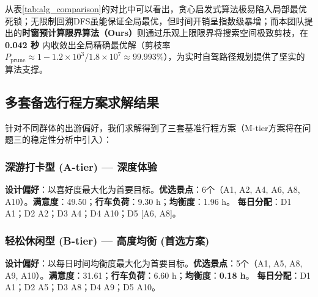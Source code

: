 \documentclass{cumcmthesis}
\begin{document}
从表\ref{tab:alg_comparison}的对比中可以看出，贪心启发式算法极易陷入局部最优死锁；无限制回溯DFS虽能保证全局最优，但时间开销呈指数级暴增；而本团队提出的\textbf{时窗预计算限界算法（Ours）}则通过乐观上限限界将搜索空间极致剪枝，在 \textbf{0.042 秒} 内收敛出全局精确最优解（剪枝率 $P_{\text{prune}} \approx 1 - 1.2\times10^3 / 1.8\times10^7 \approx 99.993\%$），为实时自驾路径规划提供了坚实的算法支撑。


\subsection{多套备选行程方案求解结果}
针对不同群体的出游偏好，我们求解得到了三套基准行程方案（M-tier方案将在问题三的稳定性分析中引入）：
\subsubsection{深游打卡型 (A-tier) — 深度体验}
\textbf{设计偏好}：以喜好度最大化为首要目标。\textbf{优选景点}：6个（A1, A2, A4, A6, A8, A10）。\textbf{满意度}：49.50；\textbf{行车负荷}：9.30 h；\textbf{均衡度}：1.96 h。
\textbf{每日分配}：D1 A1；D2 A2；D3 A4；D4 A10；D5 [A6, A8]。
\subsubsection{轻松休闲型 (B-tier) — 高度均衡 (首选方案)}
\textbf{设计偏好}：以每日时间均衡度最大化为首要目标。\textbf{优选景点}：5个（A1, A5, A8, A9, A10）。\textbf{满意度}：31.61；\textbf{行车负荷}：6.60 h；\textbf{均衡度}：\textbf{0.18 h}。
\textbf{每日分配}：D1 A1；D2 A5；D3 A8；D4 A9；D5 A10。
\end{document}
